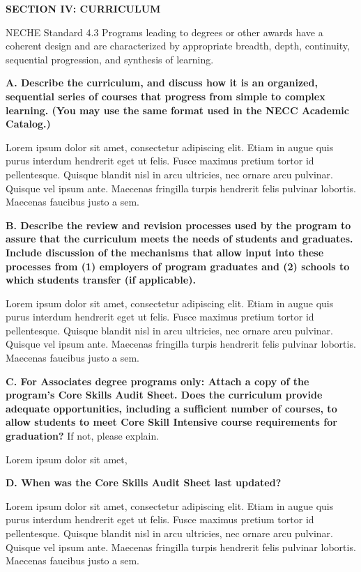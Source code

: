 \textbf{SECTION IV: CURRICULUM}

NECHE Standard 4.3 Programs leading to degrees or other awards have a coherent design and are characterized by appropriate breadth, depth, continuity, sequential progression, and synthesis of learning.


\textbf{A. Describe the curriculum, and discuss how it is an organized, sequential series of courses that progress from simple to complex learning. (You may use the same format used in the NECC Academic Catalog.)}


Lorem ipsum dolor sit amet, consectetur adipiscing elit. Etiam in augue quis purus interdum hendrerit eget ut felis. Fusce maximus pretium tortor id pellentesque. Quisque blandit nisl in arcu ultricies, nec ornare arcu pulvinar. Quisque vel ipsum ante. Maecenas fringilla turpis hendrerit felis pulvinar lobortis. Maecenas faucibus justo a sem. 


\textbf{B. Describe the review and revision processes used by the program to assure that the curriculum meets the needs of students and graduates. Include discussion of the mechanisms that allow input into these processes from (1) employers of program graduates and (2) schools to which students transfer (if applicable).}

Lorem ipsum dolor sit amet, consectetur adipiscing elit. Etiam in augue quis purus interdum hendrerit eget ut felis. Fusce maximus pretium tortor id pellentesque. Quisque blandit nisl in arcu ultricies, nec ornare arcu pulvinar. Quisque vel ipsum ante. Maecenas fringilla turpis hendrerit felis pulvinar lobortis. Maecenas faucibus justo a sem. 

\textbf{C. For Associates degree programs only: Attach a copy of the program’s Core Skills Audit Sheet\footnotemark.  Does the curriculum provide adequate opportunities, including a sufficient number of courses, to allow students to meet Core Skill Intensive course requirements for graduation?} If not, please explain. 

Lorem ipsum dolor sit amet,


\textbf{D. When was the Core Skills Audit Sheet last updated?}


Lorem ipsum dolor sit amet, consectetur adipiscing elit. Etiam in augue quis purus interdum hendrerit eget ut felis. Fusce maximus pretium tortor id pellentesque. Quisque blandit nisl in arcu ultricies, nec ornare arcu pulvinar. Quisque vel ipsum ante. Maecenas fringilla turpis hendrerit felis pulvinar lobortis. Maecenas faucibus justo a sem. 


